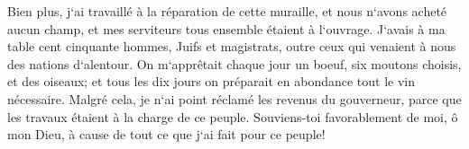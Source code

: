 \verse Bien plus, j`ai travaillé à la réparation de cette muraille, et nous n`avons acheté aucun champ, et mes serviteurs tous ensemble étaient à l`ouvrage. 
\verse J`avais à ma table cent cinquante hommes, Juifs et magistrats, outre ceux qui venaient à nous des nations d`alentour. 
\verse On m`apprêtait chaque jour un boeuf, six moutons choisis, et des oiseaux; et tous les dix jours on préparait en abondance tout le vin nécessaire. Malgré cela, je n`ai point réclamé les revenus du gouverneur, parce que les travaux étaient à la charge de ce peuple. 
\verse Souviens-toi favorablement de moi, ô mon Dieu, à cause de tout ce que j`ai fait pour ce peuple! 

\chapter{}

